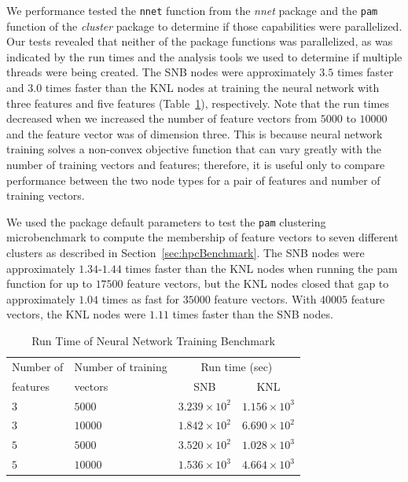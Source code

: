 We performance tested the \texttt{nnet} function from the \textit{nnet} package
  and the \texttt{pam} function of the \textit{cluster} package to determine if
  those capabilities were parallelized.
Our tests revealed that neither of the package functions was parallelized, as
  was indicated by the run times and the analysis tools we used to determine if
  multiple threads were being created.
The SNB nodes were approximately $3.5$ times faster and $3.0$ times
  faster than the KNL nodes at training the neural network with
  three features and five features (Table~\ref{tab:nnetResults}), respectively.
Note that the run times decreased when we increased the number of feature
  vectors from $5000$ to $10000$ and the feature vector was of dimension three.
This is because neural network training solves a non-convex objective function
  that can vary greatly with the number of training vectors and features;
  therefore, it is useful only to compare performance between the two node types
  for a pair of features and number of training vectors.

We used the package default parameters to test the \texttt{pam} clustering
  microbenchmark to compute the membership of feature vectors to seven
  different clusters as described in Section~\ref{sec:hpcBenchmark}.
The SNB nodes were approximately $1.34$-$1.44$ times faster than the KNL nodes
  when running the pam function for up to $17500$ feature vectors, but the KNL
  nodes closed that gap to approximately $1.04$ times as fast for $35000$
  feature vectors.
With $40005$ feature vectors, the KNL nodes were $1.11$ times faster than the
  SNB nodes.

\begin{table}
  \caption{Run Time of Neural Network Training Benchmark}
  \label{tab:nnetResults}
  \begin{tabular}{llcc}
    \toprule
      Number of & Number of training & \multicolumn{2}{c}{Run time (sec)}\\
      features  & vectors            & SNB & KNL\\
    \midrule
    $3$ & $5000$  & $3.239\times 10^{2}$ & $1.156\times 10^{3}$ \\
    $3$ & $10000$ & $1.842\times 10^{2}$ & $6.690\times 10^{2}$ \\
    $5$ & $5000$  & $3.520\times 10^{2}$ & $1.028\times 10^{3}$ \\
    $5$ & $10000$ & $1.536\times 10^{3}$ & $4.664\times 10^{3}$ \\
    \bottomrule
  \end{tabular}
\end{table}

